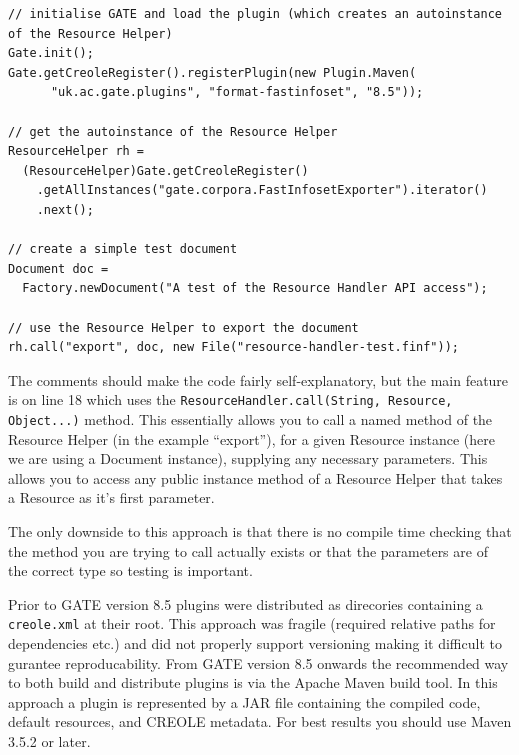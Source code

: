 \begin{lstlisting}
// initialise GATE and load the plugin (which creates an autoinstance of the Resource Helper)
Gate.init();
Gate.getCreoleRegister().registerPlugin(new Plugin.Maven(
      "uk.ac.gate.plugins", "format-fastinfoset", "8.5"));

// get the autoinstance of the Resource Helper
ResourceHelper rh =
  (ResourceHelper)Gate.getCreoleRegister()
    .getAllInstances("gate.corpora.FastInfosetExporter").iterator()
    .next();

// create a simple test document
Document doc =
  Factory.newDocument("A test of the Resource Handler API access");

// use the Resource Helper to export the document
rh.call("export", doc, new File("resource-handler-test.finf"));
\end{lstlisting}

The comments should make the code fairly self-explanatory, but the main feature
is on line 18 which uses the \lstinline!ResourceHandler.call(String, Resource, Object...)!
method. This essentially allows you to call a named method of the Resource Helper
(in the example ``export''), for a given Resource instance (here we are using a
Document instance), supplying any necessary parameters. This allows you to
access any public instance method of a Resource Helper that takes a Resource as
it's first parameter.

The only downside to this approach is that there is no compile time checking
that the method you are trying to call actually exists or that the parameters
are of the correct type so testing is important.


Prior to GATE version 8.5 plugins were distributed as direcories containing
a \verb!creole.xml! at their root. This approach was fragile (required relative
paths for dependencies etc.) and did not properly support versioning making it
difficult to gurantee reproducability. From GATE version 8.5 onwards the recommended
way to both build and distribute plugins is via the Apache Maven build tool.
In this approach a plugin is represented by a JAR file containing the compiled code,
default resources, and CREOLE metadata.  For best results you should use
Maven 3.5.2 or later.

